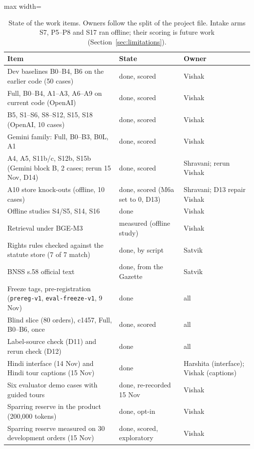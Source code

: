 \begin{table}[!t]
\centering\small
\begin{adjustbox}{max width=\textwidth}
\begin{tabular}{@{}p{3.6cm}p{1.5cm}p{1.5cm}@{}}
\toprule
Item & State & Owner \\
\midrule
Dev baselines B0--B4, B6 on the earlier code (50 cases) & done, scored & Vishak \\
Full, B0--B4, A1--A3, A6--A9 on current code (OpenAI) & done, scored & Vishak \\
B5, S1--S6, S8--S12, S15, S18 (OpenAI, 10 cases) & done, scored & Vishak \\
Gemini family: Full, B0--B3, B0L, A1 & done, scored & Vishak \\
A4, A5, S11b/c, S12b, S15b (Gemini block B, 2 cases; rerun 15 Nov, D14) & done, scored & Shravani; rerun Vishak \\
A10 store knock-outs (offline, 10 cases) & done, scored (M6a set to 0, D13) & Shravani; D13 repair Vishak \\
Offline studies S4/S5, S14, S16 & done & Vishak \\
Retrieval under BGE-M3 & measured (offline study) & Vishak \\
Rights rules checked against the statute store (7 of 7 match) & done, by script & Satvik \\
BNSS s.58 official text & done, from the Gazette & Satvik \\
Freeze tags, pre-registration (\texttt{prereg-v1}, \texttt{eval-freeze-v1}, 9 Nov) & done & all \\
Blind slice (80 orders), c1457, Full, B0--B6, once & done, scored & all \\
Label-source check (D11) and rerun check (D12) & done & all \\
Hindi interface (14 Nov) and Hindi tour captions (15 Nov) & done & Harshita (interface); Vishak (captions) \\
Six evaluator demo cases with guided tours & done, re-recorded 15 Nov & Vishak \\
Sparring reserve in the product (200,000 tokens) & done, opt-in & Vishak \\
Sparring reserve measured on 30 development orders (15 Nov) & done, scored, exploratory & Vishak \\
\bottomrule
\end{tabular}
\end{adjustbox}
\caption{State of the work items. Owners follow the split of the project file. Intake arms S7, P5--P8 and S17 ran offline; their scoring is future work (Section~\ref{sec:limitations}).}
\label{tab:status}
\end{table}

